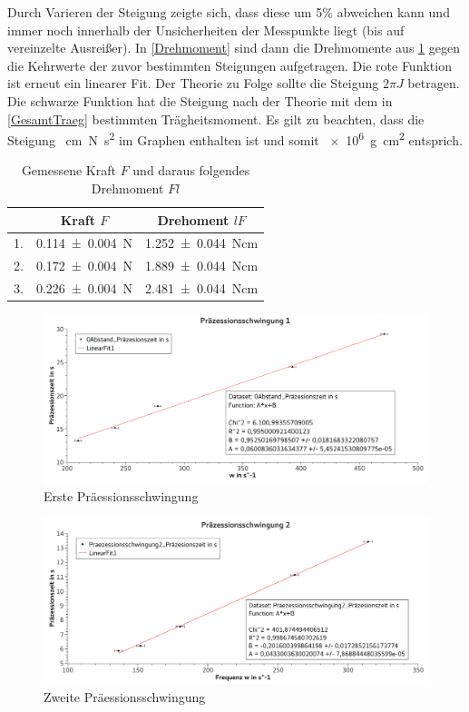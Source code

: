 \documentclass[
	a4paper,
	12pt,
	pagesize,
	ngerman
]{scrartcl}
\begin{document}
	Durch Varieren der Steigung zeigte sich, dass diese um 5\% abweichen kann und immer noch innerhalb der Unsicherheiten der Messpunkte liegt (bis auf vereinzelte Ausreißer).
	In \cref{Drehmoment} sind dann die Drehmomente aus \cref{Tabelle_Kraft} gegen die Kehrwerte der zuvor bestimmten Steigungen aufgetragen. 
	Die rote Funktion ist erneut ein linearer Fit. 
	Der Theorie zu Folge sollte die Steigung $2\pi J$ betragen. 
	Die schwarze Funktion hat die Steigung nach der Theorie mit dem in \cref{GesamtTraeg} bestimmten Trägheitsmoment.
	Es gilt zu beachten, dass die Steigung \SI{}{cm N s^2} im Graphen enthalten ist und somit \SI{e6}{g cm^2} entsprich.

	\begin{table}[tb]
		\centering
		\begin{tabular}{ r | c | c}
			& Kraft $F$ & Drehoment $lF$\\ \hline
			1.& \SI{0,114 \pm 0,004 }{N}& \SI{1,252 \pm 0,044}{Ncm} \\
			2.& \SI{0,172 \pm 0,004 }{N}& \SI{1,889 \pm 0,044}{Ncm} \\
			3.& \SI{0,226 \pm 0,004 }{N}& \SI{2,481 \pm 0,044}{Ncm} \\
		\end{tabular}
		\caption{Gemessene Kraft $F$ und daraus folgendes Drehmoment $Fl$}
		\label{Tabelle_Kraft} 
	\end{table}

	\begin{figure}[tb]
		\includegraphics[width=1\textwidth]{Praez1}
		\centering
		\caption{Erste Präessionsschwingung} %
		\label{Praez1}
		\centering
	\end{figure}

	\begin{figure}[tb]
		\includegraphics[width=1\textwidth]{Praez2}
		\centering
		\caption{Zweite Präessionsschwingung}
		\label{Praez2}
		\centering
	\end{figure}
\end{document}

